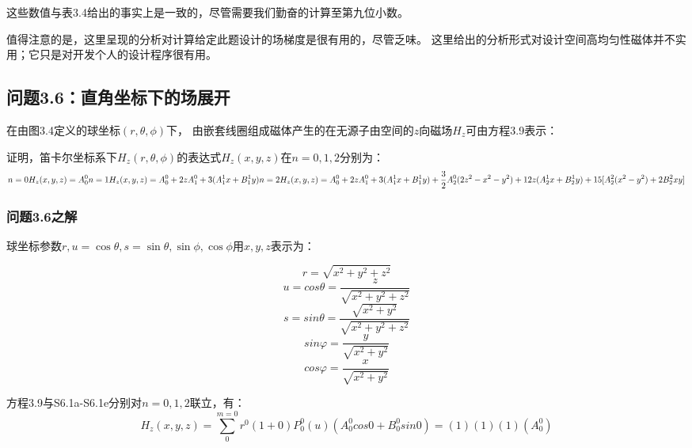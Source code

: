 这些数值与表3.4给出的事实上是一致的，尽管需要我们勤奋的计算至第九位小数。

值得注意的是，这里呈现的分析对计算给定此题设计的场梯度是很有用的，尽管乏味。
这里给出的分析形式对设计空间高均匀性磁体并不实用；它只是对开发个人的设计程序很有用。
\newpage


\subsection{问题3.6：直角坐标下的场展开}
在由图3.4定义的球坐标$(r, \theta,\phi)$下，
由嵌套线圈组成磁体产生的在无源子由空间的$z$向磁场$H_z$可由方程3.9表示：

证明，笛卡尔坐标系下$H_z(r, \theta,\phi)$的表达式$H_z(x, y, z)$在$n=0, 1, 2$分别为：
\begin{equation}%
n=0 H_z(x,y,z)=A_{0}^{0}\\
n=1 H_z(x,y,z)=A_{0}^{0}+2zA_{1}^{0}+3(A_{1}^{1}x+B_{1}^{1}y)
\\n=2 H_z(x,y,z)=A_{0}^{0}+2zA_{1}^{0}+3(A_{1}^{1}x+B_{1}^{1}y)+\frac{3}{2}A_{2}^{0}(2z^2-x^2-y^2)+12z(A_{2}^{1}x+B_{2}^{1}y)+15[A_{2}^{2}(x^2-y^2)+2B_{2}^{2}xy]
\end{equation}

\subsubsection{问题3.6之解}
球坐标参数$r, u = \cos\theta, s = \sin\theta, \sin\phi,\cos\phi$用$x,y,z$表示为：

 \begin{equation}%
r=\sqrt{x^2+y^2+z^2}
\end{equation}
\begin{equation}%
u=cos\theta=\frac{z}{\sqrt{x^2+y^2+z^2}}
\end{equation}
\begin{equation}%
s=sin\theta=\frac{\sqrt{x^2+y^2}}{\sqrt{x^2+y^2+z^2}}
\end{equation}
\begin{equation}%
sin\varphi=\frac{y}{\sqrt{x^2+y^2}}
\end{equation}
\begin{equation}%
cos\varphi=\frac{x}{\sqrt{x^2+y^2}}
\end{equation}

方程3.9与S6.1a-S6.1e分别对$n=0,1,2$联立，有：
\begin{equation}%
H_z(x,y,z)=\sum_{0}^{m=0}r^0(1+0)P_{0}^{0}(u)(A_{0}^{0}cos0+B_{0}^{0}sin0)=(1)(1)(1)(A_{0}^{0})
\end{equation}

